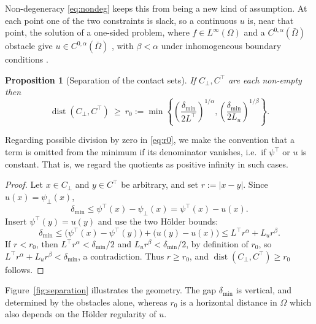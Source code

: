 \documentclass[12pt]{amsart}
\newtheorem{proposition}{Proposition}
\theoremstyle{definition}
\newcommand{\Om}{\Omega}
\newcommand{\psilo}{\psi_\bot}
\newcommand{\psiup}{\psi^\top}
\newcommand{\Cbot}{C_\bot}
\newcommand{\Ctop}{C^\top}
\begin{document}
Non-degeneracy \eqref{eq:nondeg} keeps this from being a new kind of assumption.  At each point one of the two constraints is slack, so a continuous $u$ is, near that point, the solution of a one-sided problem, where $f \in L^\infty(\Om)$ and a $C^{0,\alpha}(\bar\Om)$ obstacle give $u \in C^{0,\alpha}(\bar\Om)$ \cite[Theorem 2.1]{FinziVita1982}, with $\beta < \alpha$ under inhomogeneous boundary conditions \cite{Biroli1979}.

\begin{proposition}[Separation of the contact sets]
\label{prop:separation}
If $\Cbot, \Ctop$ are each non-empty
then
\begin{equation}
\label{eq:r0}
  \operatorname{dist}(\Cbot, \Ctop) \ \ge\ r_0
  := \min\left\{ \left(\frac{\delta_{\min}}{2 L^\top}\right)^{1/\alpha},
                 \left(\frac{\delta_{\min}}{2 L_u}\right)^{1/\beta} \right\}.
\end{equation}
\end{proposition}

Regarding possible division by zero in \eqref{eq:r0}, we make the convention that a term is omitted from the minimum if its
denominator vanishes, i.e.\ if $\psiup$ or $u$ is constant.  That is, we regard the quotients as positive infinity in such cases.

\begin{proof}
Let $x \in \Cbot$ and $y \in \Ctop$ be arbitrary, and set $r := |x-y|$.  Since $u(x) = \psilo(x)$,
\begin{equation}
  \delta_{\min} \le \psiup(x) - \psilo(x) = \psiup(x) - u(x).
\end{equation}
Insert $\psiup(y) = u(y)$ and use the two H\"older bounds:
\begin{equation}
  \delta_{\min} \le \bigl(\psiup(x) - \psiup(y)\bigr) + \bigl(u(y) - u(x)\bigr)
  \le L^\top r^\alpha + L_u r^\beta.
\end{equation}
If $r < r_0$, then
$L^\top r^\alpha < \delta_{\min}/2$ and $L_u r^\beta < \delta_{\min}/2$, by definition of $r_0$,  so $L^\top r^\alpha + L_u r^\beta < \delta_{\min}$, a contradiction. Thus
$r \ge r_0$, and $\operatorname{dist}(\Cbot,\Ctop) \ge r_0$ follows.
\end{proof}

Figure~\ref{fig:separation} illustrates the geometry.  The gap $\delta_{\min}$ is vertical, and determined by the obstacles alone, whereas $r_0$ is a horizontal distance in $\Om$ which also depends on the H\"older regularity of $u$.


\end{document}
